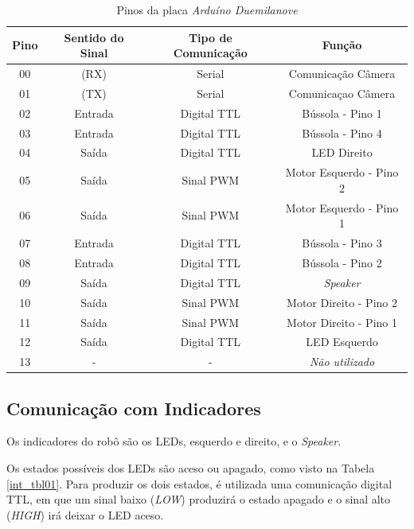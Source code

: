 \begin{table}[h!]
    \centering
    \begin{tabular}{|c|c|c|c|} \hline
        \textbf{Pino} & \textbf{Sentido do Sinal} & \textbf{Tipo de Comunicação} & \textbf{Função} \\ \hline
        00 & (RX) & Serial & Comunicação Câmera \\ \hline
        01 & (TX) & Serial & Comunicaçao Câmera \\ \hline
        02 & Entrada & Digital TTL & Bússola - Pino 1 \\ \hline
        03 & Entrada & Digital TTL & Bússola - Pino 4 \\ \hline
        04 & Saída & Digital TTL &LED Direito \\ \hline
        05 & Saída & Sinal PWM & Motor Esquerdo - Pino 2 \\ \hline
        06 & Saída & Sinal PWM & Motor Esquerdo - Pino 1 \\ \hline
        07 & Entrada & Digital TTL & Bússola - Pino 3 \\ \hline
        08 & Entrada & Digital TTL & Bússola - Pino 2 \\ \hline
        09 & Saída & Digital TTL & \textit{Speaker} \\ \hline
        10 & Saída & Sinal PWM & Motor Direito - Pino 2 \\ \hline
        11 & Saída & Sinal PWM & Motor Direito - Pino 1 \\ \hline
        12 & Saída & Digital TTL & LED Esquerdo \\ \hline
        13 & - & - & \textit{Não utilizado} \\ \hline
    \end{tabular}
    \caption{Pinos da placa \textit{Arduíno Duemilanove}}
    \label{int_tbl02}
\end{table}

\subsection{Comunicação com Indicadores}

Os indicadores do robô são os LEDs, esquerdo e direito, e o \textit{Speaker}. 

Os estados possíveis dos LEDs são aceso ou apagado, como visto na Tabela \ref{int_tbl01}. Para produzir os dois estados, é utilizada uma comunicação digital TTL, em que um sinal baixo (\textit{LOW}) produzirá o estado apagado e o sinal alto (\textit{HIGH}) irá deixar o LED aceso.

